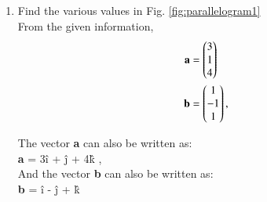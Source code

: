 \begin{enumerate}[label=\thesection.\arabic*.,ref=\thesection.\theenumi]
%
\item Find the various values in Fig. \ref{fig:parallelogram1}
\label{const:parallelogram1}
\\
%
\solution From the given information, 
\begin{align}
\label{eq:constr_a}
\mathbf{a} &= \begin{pmatrix}3\\1\\4\end{pmatrix} 
\\
\mathbf{b} &= \begin{pmatrix}1\\-1\\1\end{pmatrix}, 
\label{eq:constr_b}
\end{align}

The vector \textbf{a} can also be written as:\\
\textbf{a} = 3\^i + \^j + 4\^k ,\\
And the vector \textbf{b} can also be written as:\\
\textbf{b} = \^i - \^j + \^k
%


\end{enumerate}

